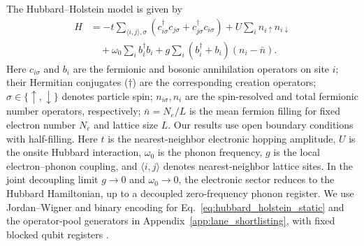 \documentclass[
  reprint,
  amsmath,
  amssymb,
  aps,
  pra,
  nofootinbib,
  superscriptaddress,
  floatfix
]{revtex4-2}
\begin{document}
The Hubbard--Holstein model \cite{ClayHardikar2005HH,Tezuka2007HH} is given by
\begin{align}
H
&=-t\sum_{\langle i,j\rangle,\sigma}
(c_{i\sigma}^{\dagger}c_{j\sigma}+c_{j\sigma}^{\dagger}c_{i\sigma})
+U\sum_i n_{i\uparrow}n_{i\downarrow}
\nonumber\\
&\quad+\omega_0\sum_i b_i^\dagger b_i
+g\sum_i(b_i^\dagger+b_i)(n_i-\bar n).
\label{eq:hubbard_holstein_static}
\end{align}
Here \(c_{i\sigma}\) and \(b_i\) are the fermionic and bosonic annihilation operators on site \(i\); their Hermitian conjugates (\(\dagger\)) are the corresponding creation operators; \(\sigma \in\{\uparrow, \downarrow\}\) denotes particle spin;
\(n_{i\sigma}, n_i\) are the spin-resolved and total fermionic number operators, respectively; \(\bar n=N_e/L\) is the mean fermion filling for fixed electron number \(N_e\) and lattice size \(L\). Our results use open boundary conditions with half-filling. Here \(t\) is the nearest-neighbor electronic hopping amplitude, \(U\) is the onsite Hubbard interaction, \(\omega_0\) is the phonon frequency, \(g\) is the local electron--phonon coupling, and \(\langle i,j\rangle\) denotes nearest-neighbor lattice sites.
In the joint decoupling limit $g\to0$ and $\omega_0\to0$, the electronic sector reduces to the Hubbard Hamiltonian, up to a decoupled zero-frequency phonon register. We use Jordan--Wigner and binary encoding for Eq.~\eqref{eq:hubbard_holstein_static} and the operator-pool generators in Appendix~\ref{app:lane_shortlisting}, with fixed blocked qubit registers \cite{Sawaya2020,Peng2025BosonHamiltonians}.
\end{document}
